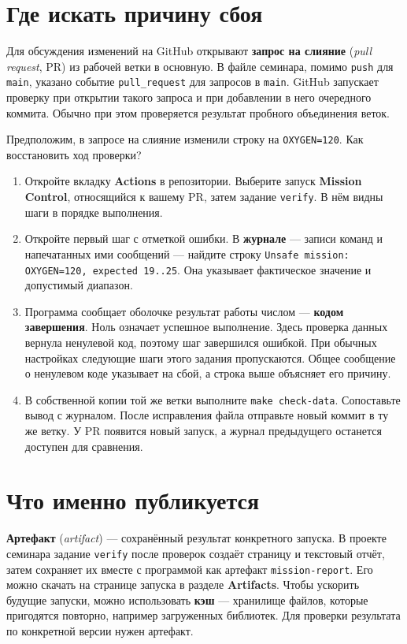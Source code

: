 \section{Где искать причину сбоя}

Для обсуждения изменений на GitHub открывают \textbf{запрос на слияние} (\emph{pull request}, PR) из рабочей ветки в основную. В файле семинара, помимо \texttt{push} для \texttt{main}, указано событие \texttt{pull\_request} для запросов в \texttt{main}. GitHub запускает проверку при открытии такого запроса и при добавлении в него очередного коммита. Обычно при этом проверяется результат пробного объединения веток.

Предположим, в запросе на слияние изменили строку на \texttt{OXYGEN=120}. Как восстановить ход проверки?

\begin{enumerate}
\item Откройте вкладку \textbf{Actions} в репозитории. Выберите запуск \textbf{Mission Control}, относящийся к вашему PR, затем задание \texttt{verify}. В нём видны шаги в порядке выполнения.
\item Откройте первый шаг с отметкой ошибки. В \textbf{журнале} — записи команд и напечатанных ими сообщений — найдите строку \texttt{Unsafe mission: OXYGEN=120, expected 19..25}. Она указывает фактическое значение и допустимый диапазон.
\item Программа сообщает оболочке результат работы числом — \textbf{кодом завершения}. Ноль означает успешное выполнение. Здесь проверка данных вернула ненулевой код, поэтому шаг завершился ошибкой. При обычных настройках следующие шаги этого задания пропускаются. Общее сообщение о ненулевом коде указывает на сбой, а строка выше объясняет его причину.
\item В собственной копии той же ветки выполните \texttt{make check-data}. Сопоставьте вывод с журналом. После исправления файла отправьте новый коммит в ту же ветку. У PR появится новый запуск, а журнал предыдущего останется доступен для сравнения.
\end{enumerate}

\section{Что именно публикуется}

\textbf{Артефакт} (\emph{artifact}) — сохранённый результат конкретного запуска. В проекте семинара задание \texttt{verify} после проверок создаёт страницу и текстовый отчёт, затем сохраняет их вместе с программой как артефакт \texttt{mission-report}. Его можно скачать на странице запуска в разделе \textbf{Artifacts}. Чтобы ускорить будущие запуски, можно использовать \textbf{кэш} — хранилище файлов, которые пригодятся повторно, например загруженных библиотек. Для проверки результата по конкретной версии нужен артефакт.

